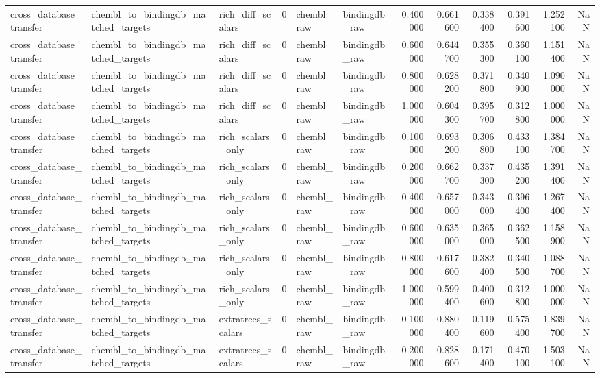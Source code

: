 \begin{longtable}{lllrllrrrrrr}
cross\_database\_transfer & chembl\_to\_bindingdb\_matched\_targets & rich\_diff\_scalars & 0 & chembl\_raw & bindingdb\_raw & 0.400000 & 0.661600 & 0.338400 & 0.391600 & 1.252100 & NaN \\
cross\_database\_transfer & chembl\_to\_bindingdb\_matched\_targets & rich\_diff\_scalars & 0 & chembl\_raw & bindingdb\_raw & 0.600000 & 0.644700 & 0.355300 & 0.360100 & 1.151400 & NaN \\
cross\_database\_transfer & chembl\_to\_bindingdb\_matched\_targets & rich\_diff\_scalars & 0 & chembl\_raw & bindingdb\_raw & 0.800000 & 0.628200 & 0.371800 & 0.340900 & 1.090000 & NaN \\
cross\_database\_transfer & chembl\_to\_bindingdb\_matched\_targets & rich\_diff\_scalars & 0 & chembl\_raw & bindingdb\_raw & 1.000000 & 0.604300 & 0.395700 & 0.312800 & 1.000000 & NaN \\
cross\_database\_transfer & chembl\_to\_bindingdb\_matched\_targets & rich\_scalars\_only & 0 & chembl\_raw & bindingdb\_raw & 0.100000 & 0.693200 & 0.306800 & 0.433100 & 1.384700 & NaN \\
cross\_database\_transfer & chembl\_to\_bindingdb\_matched\_targets & rich\_scalars\_only & 0 & chembl\_raw & bindingdb\_raw & 0.200000 & 0.662700 & 0.337300 & 0.435200 & 1.391400 & NaN \\
cross\_database\_transfer & chembl\_to\_bindingdb\_matched\_targets & rich\_scalars\_only & 0 & chembl\_raw & bindingdb\_raw & 0.400000 & 0.657000 & 0.343000 & 0.396400 & 1.267400 & NaN \\
cross\_database\_transfer & chembl\_to\_bindingdb\_matched\_targets & rich\_scalars\_only & 0 & chembl\_raw & bindingdb\_raw & 0.600000 & 0.635000 & 0.365000 & 0.362500 & 1.158900 & NaN \\
cross\_database\_transfer & chembl\_to\_bindingdb\_matched\_targets & rich\_scalars\_only & 0 & chembl\_raw & bindingdb\_raw & 0.800000 & 0.617600 & 0.382400 & 0.340500 & 1.088700 & NaN \\
cross\_database\_transfer & chembl\_to\_bindingdb\_matched\_targets & rich\_scalars\_only & 0 & chembl\_raw & bindingdb\_raw & 1.000000 & 0.599400 & 0.400600 & 0.312800 & 1.000000 & NaN \\
cross\_database\_transfer & chembl\_to\_bindingdb\_matched\_targets & extratrees\_scalars & 0 & chembl\_raw & bindingdb\_raw & 0.100000 & 0.880400 & 0.119600 & 0.575400 & 1.839700 & NaN \\
cross\_database\_transfer & chembl\_to\_bindingdb\_matched\_targets & extratrees\_scalars & 0 & chembl\_raw & bindingdb\_raw & 0.200000 & 0.828600 & 0.171400 & 0.470100 & 1.503100 & NaN \\

\end{longtable}
